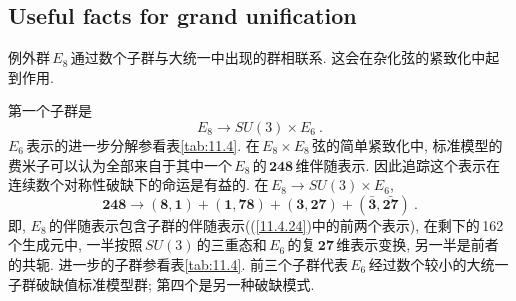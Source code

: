 \subsection*{Useful facts for grand unification}

例外群$\,E_{8}\,$通过数个子群与大统一中出现的群相联系. 这会在杂化弦的紧致化中起到作用. 

第一个子群是
\begin{equation}
    E_{8} \to SU(3) \times E_{6} \:. \label{11.4.23}
\end{equation}
$E_{6}\,$表示的进一步分解参看表\ref{tab:11.4}. 在$\,E_{8}\times E_{8}\,$弦的简单紧致化中, 标准模型的费米子可以认为全部来自于其中一个$\,E_{8}\,$的$\,\mathbf{248}\,$维伴随表示. 因此追踪这个表示在连续数个对称性破缺下的命运是有益的. 在$\,E_{8}\to SU(3)\times E_{6}$,
\begin{equation}
    \mathbf{248} \to (\mathbf{8},\mathbf{1})+ (\mathbf{1},\mathbf{78})+ (\mathbf{3},\mathbf{27})
    +(\bar{\mathbf{3}},\bar{\mathbf{27}}) \:. \label{11.4.24}
\end{equation}
即, $E_{8}\,$的伴随表示包含子群的伴随表示((\ref{11.4.24})中的前两个表示), 在剩下的\,162\,个生成元中, 一半按照$\,SU(3)\,$的三重态和$\,E_{6}\,$的复$\,\mathbf{27}\,$维表示变换, 另一半是前者的共轭. 进一步的子群参看表\ref{tab:11.4}. 前三个子群代表$\,E_{6}\,$经过数个较小的大统一子群破缺值标准模型群; 第四个是另一种破缺模式.

